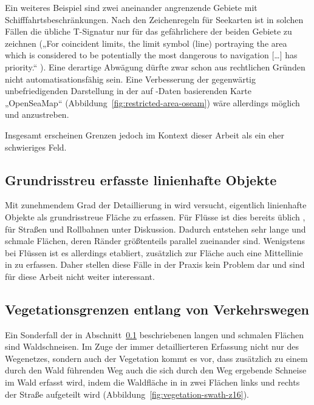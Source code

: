 \documentclass[../main/thesis.tex]{subfiles}
\begin{document}
Ein weiteres Beispiel sind zwei aneinander angrenzende Gebiete mit Schifffahrtsbeschränkungen.
Nach den Zeichenregeln für Seekarten ist in solchen Fällen die übliche T-Signatur  nur für das gefährlichere der beiden Gebiete zu zeichnen („For coincident limits, the limit symbol (line) portraying the area which is considered to be potentially the most dangerous to navigation […] has priority.“ ).
Eine derartige Abwägung dürfte zwar schon aus rechtlichen Gründen nicht automatisationsfähig sein.
Eine Verbesserung der gegenwärtig unbefriedigenden Darstellung in der auf \osm-Daten basierenden Karte „OpenSeaMap“ (Abbildung~\ref{fig:restricted-area-oseam}) wäre allerdings möglich und anzustreben.

Insgesamt erscheinen Grenzen jedoch im Kontext dieser Arbeit als ein eher schwieriges Feld.


\subsection{Grundrisstreu erfasste linienhafte Objekte}
\label{ground-plan-linear-objects-case-desc}

Mit zunehmendem Grad der Detaillierung in \osm{} wird versucht, eigentlich linienhafte Objekte als grundrisstreue Fläche zu erfassen. Für Flüsse ist dies bereits üblich , für Straßen und Rollbahnen unter Diskussion.
Dadurch entstehen sehr lange und schmale Flächen, deren Ränder größtenteils parallel zueinander sind.
Wenigstens bei Flüssen ist es allerdings etabliert, zusätzlich zur Fläche auch eine Mittellinie in \osm{} zu erfassen.
Daher stellen diese Fälle in der Praxis kein Problem dar und sind für diese Arbeit nicht weiter interessant.


\subsection{Vegetationsgrenzen entlang von Verkehrswegen}

Ein Sonderfall der in Abschnitt~\ref{ground-plan-linear-objects-case-desc} beschriebenen langen und schmalen Flächen sind Waldschneisen.
Im Zuge der immer detaillierteren Erfassung nicht nur des Wegenetzes, sondern auch der Vegetation kommt es vor, dass zusätzlich zu einem durch den Wald führenden Weg auch die sich durch den Weg ergebende Schneise im Wald erfasst wird, indem die Waldfläche in \osm{} in zwei Flächen links und rechts der Straße aufgeteilt wird (Abbildung~\ref{fig:vegetation-swath-z16}).
\end{document}
